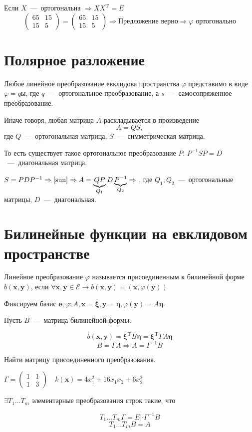 Если $X$~---~ортогональна $\Rightarrow XX^{\text{T}}=E$
$$\left(\begin{array}{rr}
    65 & 15 \\
     15&5
\end{array}\right)=\left(\begin{array}{rr}
    65 & 15 \\
     15&5
\end{array}\right) \Rightarrow \text{Предложение верно} \Rightarrow \varphi \text{ ортогонально}$$

\section{Полярное разложение}

\begin{theorem}
Любое линейное преобразование евклидова пространства $\varphi$ представимо в виде $\varphi=qы$, где $q$~---~ортогональное преобразование, а $s$~---~самосопряженное преобразование.
\end{theorem}
Иначе говоря, любая матрица $A$ раскладывается в произведение
\begin{equation}
A=QS,\tag{\sun}
\label{sun}
\end{equation}
где $Q$~---~ортогональная матрица, $S$~---~симметрическая матрица.

То есть существует такое ортогональное преобразование $P: \, P^{-1}SP=D$~---~диагональная матрица.

$S=PDP^{-1} \Rightarrow \eqref{sun} \Rightarrow A=\underbrace{QP}_{Q_1}D\underbrace{P^{-1}}_{Q_2} \Rightarrow$ , где $Q_1,Q_2$~---~ортогональные матрицы, $D$~---~диагональная.
\section{Билинейные функции на евклидовом пространстве}
\begin{definition}
Линейное преобразование $\varphi$ называется присоединенным к билинейной форме $b(\textbf{x}, \textbf{y})$, если $\forall \textbf{x}, \textbf{y} \in \mathcal{E} \rightarrow b(\textbf{x}, \textbf{y})=(\textbf{x}, \varphi(\textbf{y}))$
\end{definition}
Фиксируем базис $\textbf{e}, \varphi: A, \textbf{x}=\bm\xi, \textbf{y}=\bm\eta, \varphi(\textbf{y})=A\bm\eta.$

Пусть $B$~---~матрица билинейной формы.

$$b(\textbf{x}, \textbf{y}) = \bm\xi^{\text{T}} B\bm\eta=\bm\xi^{\text{T}} \Gamma A \bm\eta$$
$$\boxed{B = \Gamma A}\Rightarrow A=\Gamma^{-1}B$$

\begin{prim}
Найти матрицу присоединенного преобразования.

$\Gamma=\left(\begin{array}{rr}
    1 & 1 \\
     1&3
\end{array}\right) \quad k(\textbf{x})=4x_1^2+16x_1x_2+6x_2^2$
\end{prim}
$\exists T_1\dots T_m$ элементарные преобразования строк такие, что

$$T_1\dots T_m \Gamma=E | \cdot \Gamma^{-1}B$$
$$T_1\dots T_mB=A$$
